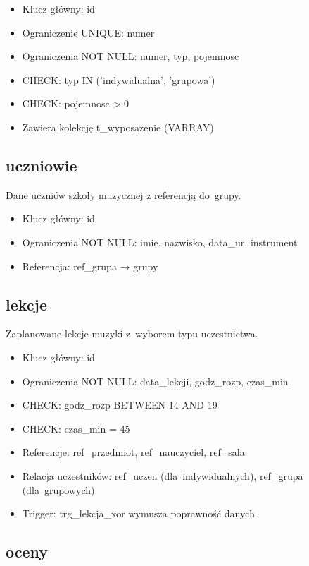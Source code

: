 \documentclass[12pt,a4paper]{article}
\begin{document}
\begin{itemize}[nosep]
    \item Klucz główny: id
    \item Ograniczenie UNIQUE: numer
    \item Ograniczenia NOT NULL: numer, typ, pojemnosc
    \item CHECK: typ IN ('indywidualna', 'grupowa')
    \item CHECK: pojemnosc > 0
    \item Zawiera kolekcję t\_wyposazenie (VARRAY)
\end{itemize}

\subsection{uczniowie}

Dane uczniów szkoły muzycznej z referencją do~grupy.

\begin{itemize}[nosep]
    \item Klucz główny: id
    \item Ograniczenia NOT NULL: imie, nazwisko, data\_ur, instrument
    \item Referencja: ref\_grupa → grupy
\end{itemize}

\subsection{lekcje}

Zaplanowane lekcje muzyki z~wyborem typu uczestnictwa.

\begin{itemize}[nosep]
    \item Klucz główny: id
    \item Ograniczenia NOT NULL: data\_lekcji, godz\_rozp, czas\_min
    \item CHECK: godz\_rozp BETWEEN 14 AND 19
    \item CHECK: czas\_min = 45
    \item Referencje: ref\_przedmiot, ref\_nauczyciel, ref\_sala
    \item Relacja uczestników: ref\_uczen (dla~indywidualnych), ref\_grupa (dla~grupowych)
    \item Trigger: trg\_lekcja\_xor wymusza poprawność danych
\end{itemize}

\subsection{oceny}
\end{document}
